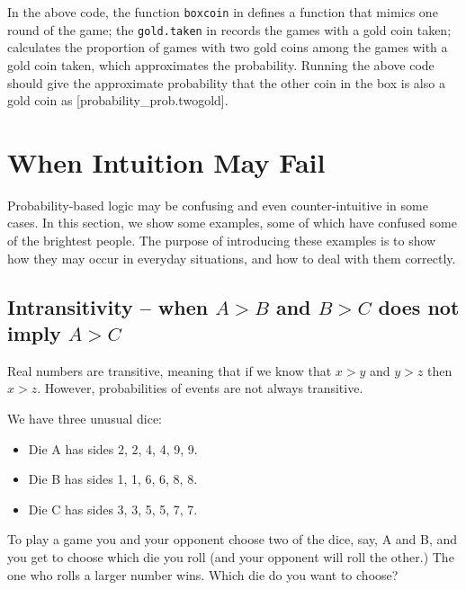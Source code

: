 In the above code, the function \lstinline{boxcoin} in  defines a
function that mimics one round of the game; the \lstinline{gold.taken} in
 records the games with a gold coin taken;  calculates
the proportion of games with two gold coins among the games with a gold coin
taken, which approximates the probability.  Running the above code should give
the approximate probability that the other coin in the box is also a gold coin
as
[probability_prob.twogold].


\section{When Intuition May Fail}
Probability-based logic may be confusing and even counter-intuitive in some
cases. In this section, we show some examples, some of which have confused some of
the brightest people. The purpose of introducing these examples is to show how
they may occur in everyday situations, and how to deal with them correctly.

\subsection{Intransitivity -- when $A>B$ and $B>C$ does not imply
  $A>C$}\label{sec:Intransitive-Dice}
Real numbers are transitive, meaning that if
we know that $x>y$ and $y>z$ then $x>z$. However, probabilities of events are
not always transitive. 
\begin{example}
We have three unusual dice:
\begin{itemize}
\item Die A has sides 2, 2, 4, 4, 9, 9.
\item Die B has sides 1, 1, 6, 6, 8, 8.
\item Die C has sides 3, 3, 5, 5, 7, 7.
\end{itemize}
\end{example}

To play a game you and your opponent choose two of the dice, say, A and B, and
you get to choose which die you roll (and your opponent will roll the other.)
The one who rolls a larger number wins. Which die do you want to choose?

